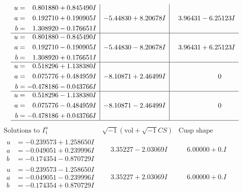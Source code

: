 \documentclass[1p]{elsarticle_modified}
\theoremstyle{definition}
\newcommand{\I}{\sqrt{-1}}
\begin{document}
$$\begin{array}{c|c|c}
\begin{aligned}
u &= \phantom{-}0.801880 + 0.845490 I \\
a &= \phantom{-}0.192710 + 0.190905 I \\
b &= \phantom{-}1.308920 - 0.176651 I\end{aligned}
 & -5.44830 + 8.20678 I & \phantom{-}3.96431 - 6.25123 I \\ \hline\begin{aligned}
u &= \phantom{-}0.801880 - 0.845490 I \\
a &= \phantom{-}0.192710 - 0.190905 I \\
b &= \phantom{-}1.308920 + 0.176651 I\end{aligned}
 & -5.44830 - 8.20678 I & \phantom{-}3.96431 + 6.25123 I \\ \hline\begin{aligned}
u &= \phantom{-}0.518296 + 1.138380 I \\
a &= \phantom{-}0.075776 + 0.484959 I \\
b &= -0.478186 - 0.043766 I\end{aligned}
 & -8.10871 + 2.46499 I & \phantom{-0.000000 } 0 \\ \hline\begin{aligned}
u &= \phantom{-}0.518296 - 1.138380 I \\
a &= \phantom{-}0.075776 - 0.484959 I \\
b &= -0.478186 + 0.043766 I\end{aligned}
 & -8.10871 - 2.46499 I & \phantom{-0.000000 } 0\\
 \hline 
 \end{array}$$\newpage$$\begin{array}{c|c|c}  
\text{Solutions to }I^u_{1}& \I (\text{vol} + \sqrt{-1}CS) & \text{Cusp shape}\\
 \hline 
\begin{aligned}
u &= -0.239573 + 1.258650 I \\
a &= -0.049051 + 0.239996 I \\
b &= -0.174354 - 0.870729 I\end{aligned}
 & \phantom{-}3.35227 - 2.03069 I & \phantom{-}6.00000 + 0. I\phantom{ +0.000000I} \\ \hline\begin{aligned}
u &= -0.239573 - 1.258650 I \\
a &= -0.049051 - 0.239996 I \\
b &= -0.174354 + 0.870729 I\end{aligned}
 & \phantom{-}3.35227 + 2.03069 I & \phantom{-}6.00000 + 0. I\phantom{ +0.000000I} \\ \hline\begin{aligned}

\end{aligned}
\end{array}$$
\end{document}
